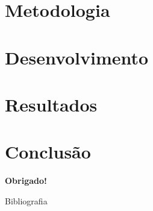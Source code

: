 \documentclass{beamer}
\begin{document}
\section{Metodologia}


\section{Desenvolvimento}


\section{Resultados}



\section{Conclusão}


\begin{frame}
    \begin{center}
        \textbf{Obrigado!}
    \end{center}   
\end{frame}


\begin{frame}[allowframebreaks]{Bibliografia}
	
	
\end{frame}
\end{document}
